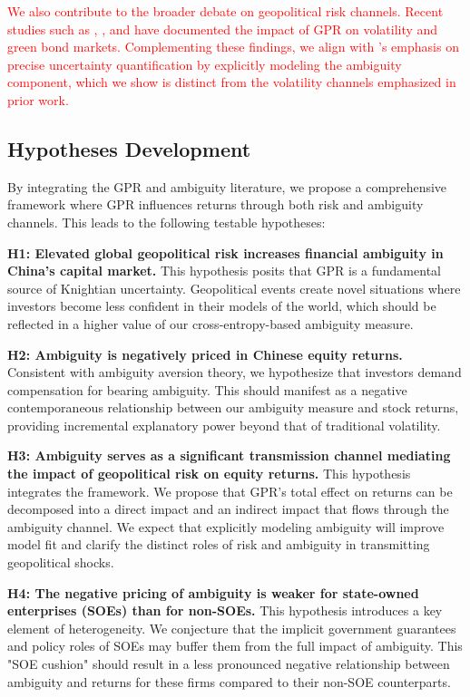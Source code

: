 \documentclass[preprint,12pt,authoryear]{elsarticle}
\begin{document}
    \textcolor{red}{We also contribute to the broader debate on geopolitical risk channels. Recent studies such as \citet{Bouri2024}, \citet{Liu2024}, and \citet{Zhang2023} have documented the impact of GPR on volatility and green bond markets. Complementing these findings, we align with \citet{Nemani2023}'s emphasis on precise uncertainty quantification by explicitly modeling the ambiguity component, which we show is distinct from the volatility channels emphasized in prior work.}

\subsection{Hypotheses Development}

By integrating the GPR and ambiguity literature, we propose a comprehensive framework where GPR influences returns through both risk and ambiguity channels. This leads to the following testable hypotheses:

\textbf{H1: Elevated global geopolitical risk increases financial ambiguity in China's capital market.}
This hypothesis posits that GPR is a fundamental source of Knightian uncertainty. Geopolitical events create novel situations where investors become less confident in their models of the world, which should be reflected in a higher value of our cross-entropy-based ambiguity measure.

\textbf{H2: Ambiguity is negatively priced in Chinese equity returns.}
Consistent with ambiguity aversion theory, we hypothesize that investors demand compensation for bearing ambiguity. This should manifest as a negative contemporaneous relationship between our ambiguity measure and stock returns, providing incremental explanatory power beyond that of traditional volatility.

\textbf{H3: Ambiguity serves as a significant transmission channel mediating the impact of geopolitical risk on equity returns.}
This hypothesis integrates the framework. We propose that GPR's total effect on returns can be decomposed into a direct impact and an indirect impact that flows through the ambiguity channel. We expect that explicitly modeling ambiguity will improve model fit and clarify the distinct roles of risk and ambiguity in transmitting geopolitical shocks.

\textbf{H4: The negative pricing of ambiguity is weaker for state-owned enterprises (SOEs) than for non-SOEs.}
This hypothesis introduces a key element of heterogeneity. We conjecture that the implicit government guarantees and policy roles of SOEs may buffer them from the full impact of ambiguity. This "SOE cushion" should result in a less pronounced negative relationship between ambiguity and returns for these firms compared to their non-SOE counterparts.
\end{document}
